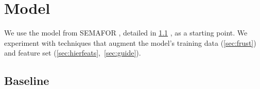 \documentclass[11pt,a4paper]{article}
\newcommand{\finalversion}[1]{#1}
\begin{document}

\section{Model}

We use the model from SEMAFOR \citep{das-14}, detailed in
\cref{sec:base_model}%
, as a starting point.
We experiment with %
techniques that augment
the model's training data (\cref{sec:frust}) and feature set %
(\cref{sec:hierfeats},~\cref{sec:guide}).

\subsection{Baseline}
\label{sec:base_model}
\end{document}
